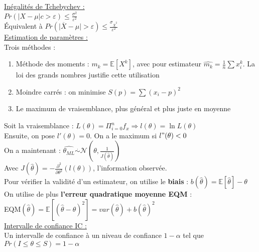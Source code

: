 \documentclass[../main.tex]{subfiles}
\begin{document}
\quad \underline{Inégalités de Tchebychev :}\\
$Pr(\lvert X-\mu \rvert c> \varepsilon) \leq \frac{\sigma^2}{\varepsilon^2}$\\
Équivalent à $Pr(\lvert \overline{X} - \mu\rvert > \varepsilon) \leq \frac{\sigma_{\overline{X}^2}}{\varepsilon^2}$\\

\quad \underline{Estimation de paramètres :}\\
Trois méthodes : \\
\begin{enumerate}
    \item Méthode des moments : $m_k = \mathbb{E}[X^k]$, avec pour estimateur $\hat{m_k} = \frac{1}{n} \sum x_i^k$. La loi des grands nombres justifie cette utilisation\\
    \item Moindre carrés : on minimise $S(p) = \sum(x_i-p)^2$\\
    \item Le maximum de vraisemblance, plus général et plus juste en moyenne\\
\end{enumerate}

Soit la vraisemblance : $L(\theta) = \Pi_{i=0}^n f_x \Rightarrow l(\theta) = \ln{L(\theta)}$\\
Ensuite, on pose $l'(\theta) = 0$. On a le maximum si $l"(\theta) <0$\\

On a maintenant : $\hat{\theta_{ML}} \stackrel{.}{\sim} \mathcal{N}(\theta, \frac{1}{J(\hat{\theta})})$\\
Avec $J(\hat{\theta}) = -\frac{\partial^2}{\partial \theta^2}(l(\theta))$, l'information observée.\\

Pour vérifier la validité d'un estimateur, on utilise le \textbf{biais} : $b(\hat{\theta}) = \mathbb{E}[\hat{\theta}] - \theta$\\
On utilise de plus \textbf{l'erreur quadratique moyenne EQM} : \\
EQM$(\hat{\theta}) = \mathbb{E}[(\hat{\theta}-\theta)^2] = var(\hat{\theta}) + b(\hat{\theta})^2$\\

\quad \underline{Intervalle de confiance IC :}\\
Un intervalle de confiance à un niveau de confiance $1-\alpha$ tel que $Pr(I \leq \theta \leq S) = 1-\alpha$\\
\end{document}
